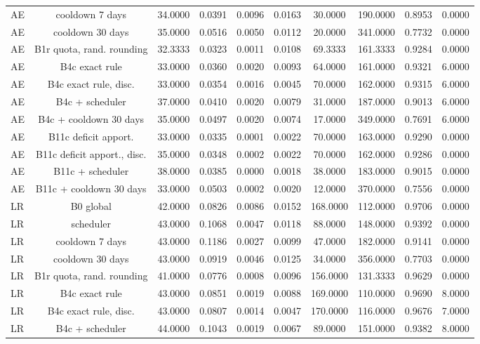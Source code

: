 \documentclass[10pt,onecolumn,letterpaper]{article}
\begin{document}
\begin{table}[!t]
{\begin{tabular}{lccccccccc}
AE & cooldown 7 days & 34.0000 & 0.0391 & 0.0096 & 0.0163 & 30.0000 & 190.0000 & 0.8953 & 0.0000 \\
AE & cooldown 30 days & 35.0000 & 0.0516 & 0.0050 & 0.0112 & 20.0000 & 341.0000 & 0.7732 & 0.0000 \\
AE & B1r quota, rand. rounding & 32.3333 & 0.0323 & 0.0011 & 0.0108 & 69.3333 & 161.3333 & 0.9284 & 0.0000 \\
AE & B4c exact rule & 33.0000 & 0.0360 & 0.0020 & 0.0093 & 64.0000 & 161.0000 & 0.9321 & 6.0000 \\
AE & B4c exact rule, disc. & 33.0000 & 0.0354 & 0.0016 & 0.0045 & 70.0000 & 162.0000 & 0.9315 & 6.0000 \\
AE & B4c + scheduler & 37.0000 & 0.0410 & 0.0020 & 0.0079 & 31.0000 & 187.0000 & 0.9013 & 6.0000 \\
AE & B4c + cooldown 30 days & 35.0000 & 0.0497 & 0.0020 & 0.0074 & 17.0000 & 349.0000 & 0.7691 & 6.0000 \\
AE & B11c deficit apport. & 33.0000 & 0.0335 & 0.0001 & 0.0022 & 70.0000 & 163.0000 & 0.9290 & 0.0000 \\
AE & B11c deficit apport., disc. & 35.0000 & 0.0348 & 0.0002 & 0.0022 & 70.0000 & 162.0000 & 0.9286 & 0.0000 \\
AE & B11c + scheduler & 38.0000 & 0.0385 & 0.0000 & 0.0018 & 38.0000 & 183.0000 & 0.9015 & 0.0000 \\
AE & B11c + cooldown 30 days & 33.0000 & 0.0503 & 0.0002 & 0.0020 & 12.0000 & 370.0000 & 0.7556 & 0.0000 \\
LR & B0 global & 42.0000 & 0.0826 & 0.0086 & 0.0152 & 168.0000 & 112.0000 & 0.9706 & 0.0000 \\
LR & scheduler & 43.0000 & 0.1068 & 0.0047 & 0.0118 & 88.0000 & 148.0000 & 0.9392 & 0.0000 \\
LR & cooldown 7 days & 43.0000 & 0.1186 & 0.0027 & 0.0099 & 47.0000 & 182.0000 & 0.9141 & 0.0000 \\
LR & cooldown 30 days & 43.0000 & 0.0919 & 0.0046 & 0.0125 & 34.0000 & 356.0000 & 0.7703 & 0.0000 \\
LR & B1r quota, rand. rounding & 41.0000 & 0.0776 & 0.0008 & 0.0096 & 156.0000 & 131.3333 & 0.9629 & 0.0000 \\
LR & B4c exact rule & 43.0000 & 0.0851 & 0.0019 & 0.0088 & 169.0000 & 110.0000 & 0.9690 & 8.0000 \\
LR & B4c exact rule, disc. & 43.0000 & 0.0807 & 0.0014 & 0.0047 & 170.0000 & 116.0000 & 0.9676 & 7.0000 \\
LR & B4c + scheduler & 44.0000 & 0.1043 & 0.0019 & 0.0067 & 89.0000 & 151.0000 & 0.9382 & 8.0000 \\

\end{tabular}}
\end{table}
\end{document}
